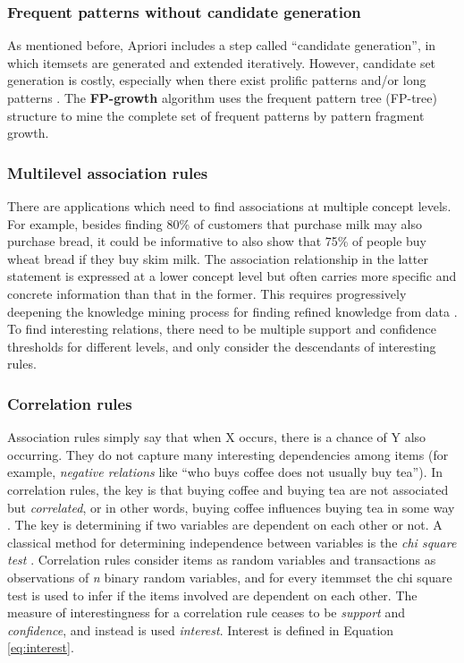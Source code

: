 \subsubsection*{Frequent patterns without candidate generation} 
As mentioned before, Apriori includes a step called “candidate generation”, in which itemsets are generated and extended iteratively.  However, candidate set generation is costly, especially when there exist prolific patterns and/or long patterns \cite{han2004mining}. The \textbf{FP-growth} algorithm \cite{han2004mining} uses the frequent pattern tree (FP-tree) structure to mine the complete set of frequent patterns by pattern fragment growth. 

\subsubsection*{Multilevel association rules}
There are applications which need to find associations at multiple concept levels. For example, besides finding 80\% of customers that purchase milk may also purchase bread, it could be informative to also show that 75\% of people buy wheat bread if they buy skim milk. The association relationship in the latter statement is expressed at a lower concept level but often carries more specific and concrete information than that in the former. This requires progressively deepening the knowledge mining process for finding refined knowledge from data \cite{han1999mining}. To find interesting relations, there need to be multiple support and confidence thresholds for different levels, and only consider the descendants of interesting rules.

\subsubsection*{Correlation rules}
Association rules simply say that when X occurs, there is a chance of Y also occurring. They do not capture many interesting dependencies among items (for example, \textit{negative relations} like “who buys coffee does not usually buy tea”). In correlation rules, the key is that buying coffee and buying tea are not 
associated but \textit{correlated}, or in other words, buying coffee influences buying tea in some way \cite{brin1997beyond}. The key is determining if two variables are dependent on each other or not. A classical method for determining independence between variables is the \textit{chi square test} \cite{lancaster1969chi}. Correlation rules consider items as random variables and transactions as observations of \textit{n} binary random variables, and for every itemmset the chi square test is used to infer if the items involved are dependent on each other. The measure of interestingness for a correlation rule ceases to be \textit{support} and \textit{confidence}, and instead is used \textit{interest}. Interest is defined in Equation \ref{eq:interest}.

